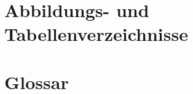 \appendix

\chapter{Abbildungs- und Tabellenverzeichnisse}
\listoffigures
\listoftables



\chapter{Glossar}
\printglossary[style=altlist]


